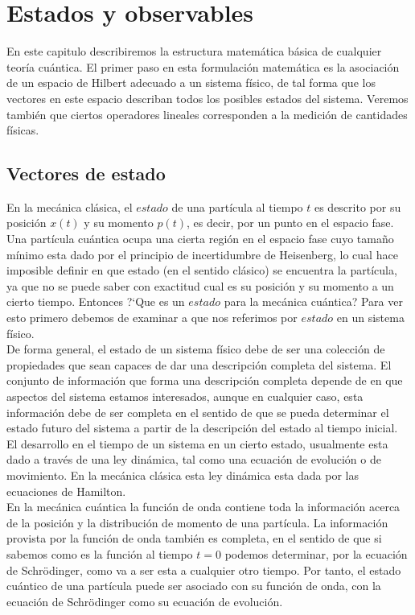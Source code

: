 \documentclass[12pt]{book}
\numberwithin{equation}{chapter}
\begin{document}
\chapter{Estados y observables}

En este capitulo describiremos la estructura matem\'atica b\'asica de cualquier teor\'ia cu\'antica. El primer paso en esta formulaci\'on matem\'atica es la asociaci\'on de un espacio de Hilbert adecuado a un sistema f\'isico, de tal forma que los vectores en este espacio describan todos los posibles estados del sistema. Veremos tambi\'en que ciertos operadores lineales corresponden a la medici\'on de cantidades f\'isicas.

\section{Vectores de estado}  
En la mec\'anica cl\'asica, el $estado$ de una part\'icula al tiempo $t$ es descrito por su posici\'on $x(t)$ y su momento $p(t)$, es decir, por un punto en el espacio fase. Una part\'icula cu\'antica ocupa una cierta regi\'on en el espacio fase cuyo tama\~no m\'inimo esta dado por el principio de incertidumbre de Heisenberg, lo cual hace imposible definir en que estado (en el sentido cl\'asico) se encuentra la part\'icula, ya que no se puede saber con exactitud cual es su posici\'on y su momento a un cierto tiempo. Entonces ?`Que es un $estado$ para la mec\'anica cu\'antica? Para ver esto primero debemos de examinar a que nos referimos por $estado$ en un sistema f\'isico. \\

De forma general, el estado de un sistema f\'isico debe de ser una colecci\'on de propiedades que sean capaces de dar una descripci\'on completa del sistema. El conjunto de informaci\'on que forma una descripci\'on completa depende de en que aspectos del sistema estamos interesados, aunque en cualquier caso, esta informaci\'on debe de ser completa en el sentido de que se pueda determinar el estado futuro del sistema a partir de la descripci\'on del estado al tiempo inicial. El desarrollo en el tiempo de un sistema en un cierto estado, usualmente esta dado a trav\'es de una ley din\'amica, tal como una ecuaci\'on de evoluci\'on o de movimiento. En la mec\'anica cl\'asica esta ley din\'amica esta dada por las ecuaciones de Hamilton.\\

En la mec\'anica cu\'antica la funci\'on de onda contiene toda la informaci\'on acerca de la posici\'on y la distribuci\'on de momento de una part\'icula. La informaci\'on provista por la funci\'on de onda tambi\'en es completa, en el sentido de que si sabemos como es la funci\'on al tiempo $t=0$ podemos determinar, por la ecuaci\'on de Schr\"odinger, como va a ser esta a cualquier otro tiempo. Por tanto, el estado cu\'antico de una part\'icula puede ser asociado con su funci\'on de onda, con la ecuaci\'on de Schr\"odinger como su ecuaci\'on de evoluci\'on. \\
\end{document}
